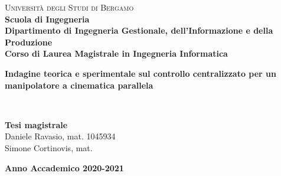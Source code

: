 \begin{titlepage}

\noindent
\begin{minipage}[t]{0.19\textwidth}

\end{minipage}
\begin{minipage}[t]{0.81\textwidth}
{
	{\textsc{Università degli Studi di Bergamo}} \\
	\textbf{Scuola di Ingegneria} \\
	\textbf{Dipartimento di Ingegneria Gestionale, dell'Informazione e della Produzione} \\
	\textbf{Corso di Laurea Magistrale in Ingegneria Informatica} \\
	\par
}
\end{minipage}

\vspace{35mm}

\begin{center}
	{\LARGE{
			\textbf{Indagine teorica e sperimentale sul controllo centralizzato per un manipolatore a cinematica parallela} \\
			\textbf{}
			\par
	}}
\end{center}

\vspace{30mm}

\noindent
{\large} \\

\vspace{20mm}

\begin{flushright}
	{\large \textbf{Tesi magistrale}} \\
	\large{Daniele Ravasio, mat. 1045934} \\
	\large{Simone Cortinovis, mat. } \\
\end{flushright}

\vspace{10mm}

\begin{center}
    {\large{\bf Anno Accademico 2020-2021}}
\end{center}

\restoregeometry

\end{titlepage}